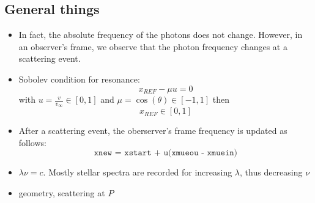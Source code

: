 \documentclass[../main/main.tex]{subfiles}
\begin{document}
\subsection{General things}
\begin{itemize}
\item In fact, the absolute frequency of the photons does not change. However, in an observer's frame, we observe that the photon frequency changes at a scattering event.

\item Sobolev condition for resonance:
\begin{equation}
x_{REF} - \mu u = 0
\end{equation}
with $u = \frac{v}{v_{\infty}} \in [0,1]$ and $\mu = \cos(\theta) \in [-1,1]$ then 
\begin{equation}
x_{REF} \in [0,1]
\end{equation}

\item After a scattering event, the oberserver's frame frequency is updated as follows:
\begin{equation}
\texttt{xnew = xstart + u(xmueou - xmuein)}
\label{xnew_vx_xstart}
\end{equation}

\item $\lambda \nu = c$. Mostly stellar spectra are recorded for increasing $\lambda$, thus decreasing $\nu$

\item geometry, scattering at $P$
\begin{center}
\end{center}
\end{itemize}
\end{document}
